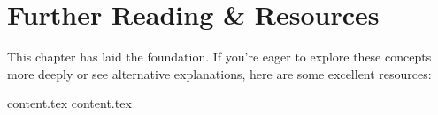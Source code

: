 \clearpage
\section{Further Reading \& Resources}
\label{sec:A.6}

This chapter has laid the foundation. If you're eager to explore these concepts more deeply or see alternative explanations, here are some excellent resources:

{content.tex}
{content.tex}
